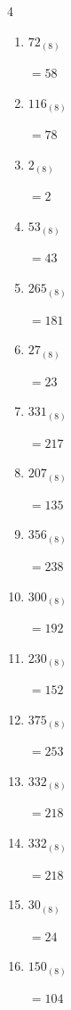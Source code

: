 \begin{multicols}{4}
\begin{enumerate}
  \item $72_{(8)}$

        $=58$

  \item $116_{(8)}$

        $=78$

  \item $2_{(8)}$

        $=2$

  \item $53_{(8)}$

        $=43$

  \item $265_{(8)}$

        $=181$

  \item $27_{(8)}$

        $=23$

  \item $331_{(8)}$

        $=217$

  \item $207_{(8)}$

        $=135$

\columnbreak %

\resetques

  \item $356_{(8)}$

        $=238$

  \item $300_{(8)}$

        $=192$

  \item $230_{(8)}$

        $=152$

  \item $375_{(8)}$

        $=253$

  \item $332_{(8)}$

        $=218$

  \item $332_{(8)}$

        $=218$

  \item $30_{(8)}$

        $=24$

  \item $150_{(8)}$

        $=104$


\end{enumerate}
\end{multicols}
